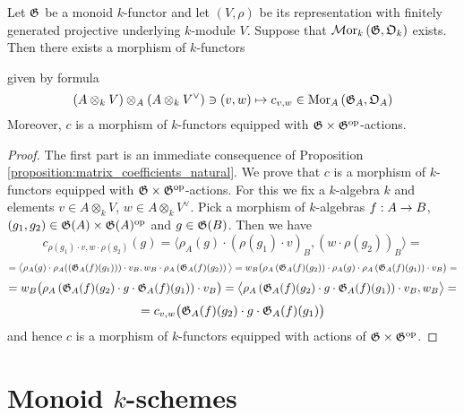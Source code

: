 \begin{corollary}\label{corollary:matrix_coefficients_natural}
Let ${\mathfrak G}$ be a monoid $k$-functor and let $(V,\rho)$ be its representation with finitely generated projective underlying $k$-module $V$. Suppose that $\mathcal{M}\mathrm{or}_k\left({\mathfrak G},{\mathfrak O}_k\right)$ exists. Then there exists a morphism of $k$-functors
\begin{center}
\end{center}
given by formula
$$\left(A\otimes_kV\right)\otimes_A\left(A\otimes_kV^{\vee}\right)\ni (v,w)\mapsto c_{v,w}\in \mathrm{Mor}_A\left({\mathfrak G}_A,{\mathfrak O}_A\right)$$
Moreover, $c$ is a morphism of $k$-functors equipped with ${\mathfrak G} \times {\mathfrak G}^{\mathrm{op}}$-actions.
\end{corollary}
\begin{proof}
The first part is an immediate consequence of Proposition \ref{proposition:matrix_coefficients_natural}. We prove that $c$ is a morphism of $k$-functors equipped with ${\mathfrak G}\times {\mathfrak G}^{\mathrm{op}}$-actions. For this we fix a $k$-algebra $k$ and elements $v\in A\otimes_kV$, $w\in A\otimes_kV^{\vee}$. Pick a morphism of $k$-algebras $f:A\rightarrow B$, $(g_1,g_2)\in {\mathfrak G}(A)\times {\mathfrak G}(A)^{\mathrm{op}}$ and $g\in {\mathfrak G}(B)$. Then we have 
$$c_{\rho(g_1)\cdot v,w\cdot \rho(g_2)}(g) = \big\langle \rho_A(g)\cdot \left(\rho(g_1)\cdot v\right)_B, \left(w\cdot \rho(g_2)\right)_B \big\rangle =$$
$$= \big\langle \rho_A(g)\cdot \rho_A(\left({\mathfrak G}_A(f)(g_1)\right))\cdot v_B, w_B\cdot \rho_A\left({\mathfrak G}_A(f)(g_2)\right) \big\rangle = w_B\big(\rho_A\left({\mathfrak G}_A(f)(g_2)\right)\cdot \rho_A(g)\cdot \rho_A\left({\mathfrak G}_A(f)(g_1)\right)\cdot v_B \big)=$$
$$= w_B\big(\rho_A\left({\mathfrak G}_A(f)(g_2) \cdot g \cdot {\mathfrak G}_A(f)(g_1)\right)\cdot v_B \big) = \big\langle \rho_A\left({\mathfrak G}_A(f)(g_2) \cdot g \cdot {\mathfrak G}_A(f)(g_1)\right)\cdot v_B, w_B \big\rangle =  $$
$$= c_{v,w}\big({\mathfrak G}_A(f)(g_2) \cdot g \cdot {\mathfrak G}_A(f)(g_1)\big)$$
and hence $c$ is a morphism of $k$-functors equipped with actions of ${\mathfrak G}\times {\mathfrak G}^{\mathrm{op}}$.
\end{proof}

\section{Monoid $k$-schemes}

